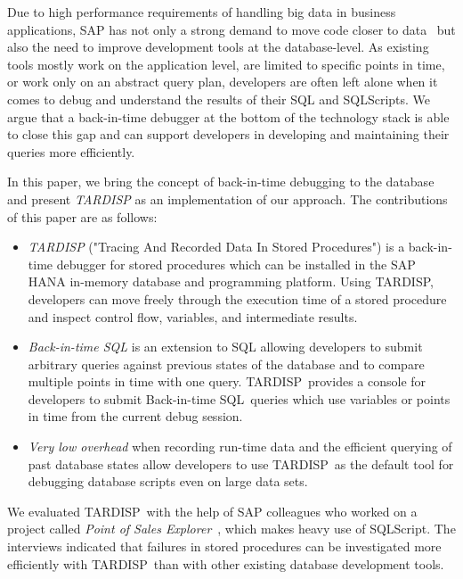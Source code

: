\documentclass[english,conference,final]{IEEEtran}
\newcommand{\tool}{TAR\-DISP}
\newcommand{\SQLextension}{Back-in-time SQL}
\begin{document}
Due to high performance requirements of handling big data in business applications, SAP has not only a strong demand to move code closer to data~\cite{plattner2015memory} but also the need to improve development tools at the database-level. 
As existing tools mostly work on the application level, are limited to specific points in time, or work only on an abstract query plan, developers are often left alone when it comes to debug and understand the results of their SQL and SQLScripts.
We argue that a back-in-time debugger at the bottom of the technology stack is able to close this gap and can support developers in developing and maintaining their queries more efficiently. 

In this paper, we bring the concept of back-in-time debugging to the database and present \emph{\tool} as an implementation of our approach.
The contributions of this paper are as follows:
\begin{itemize}
	\item \emph{\tool} ("Tracing And Recorded Data In Stored Procedures") is a back-in-time debugger for stored procedures which can be installed in the SAP HANA in-memory database and programming platform.
		Using \tool, developers can move freely through the execution time of a stored procedure and inspect control flow, variables, and intermediate results.
	
	\item \emph{\SQLextension} is an extension to SQL allowing developers to submit arbitrary queries against previous states of the database 
		and to compare multiple points in time with one query.
		\tool\ provides a console for developers to submit \SQLextension\ queries which use variables or points in time from the current debug session.

	\item \emph{Very low overhead} when recording run-time data and the efficient querying of past database states allow developers to use \tool\ as the default tool for debugging database scripts even on large data sets.
	
\end{itemize}

We evaluated \tool\ with the help of SAP colleagues who worked on a project called \emph{Point of Sales Explorer}~\cite{plattner2015memory}, which makes heavy use of SQLScript. 
The interviews indicated that failures in stored procedures can be investigated more efficiently with \tool\ than with other existing database development tools.
\end{document}
